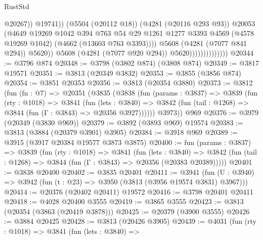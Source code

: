 \begin{lexlean}{RustStd}
\begin{coremodule}
                                              @20267))
                                          @19741))
                                      (@5504 (@20112 @18))
                                      (@4281 (@20116 @293 @93))
                                      @20053
                                      (@4649
                                        @19269
                                        @1042
                                        @394
                                        @763
                                        @54
                                        @29
                                        @1261
                                        @1277
                                        @3393
                                        @4569
                                        (@4578 @19269 @1042)
                                        (@4662 (@13603 @763 @3393))))
                                    @5608
                                    (@4281 (@7077 @841 @294))
                                    @5620))
                                @5608
                                (@4281 (@7077 @920 @294))
                                @5620))))))))))))))
@20344 := @3796 @874
@20348 := @3798 (@3802 @874) (@3808 @874)
@20349 := @3817 @19571
@20351 := @3813 (@20349 @3832)
@20353 := @3855 (@3856 @874)
@20354 := @3851 @20353
@20356 := @3813 (@20354 @3880)
@20373 := @3812
    (fun (fn : @7) =>
    @20351
      (@3835
        (@3838
          (fun (params : @3837) =>
          @3839
            (fun (rty : @1018) =>
            @3841
              (fun (lets : @3840) =>
              @3842 (fun (tail : @1268) => @3844 (fun (Γ : @3843) => @20356 @3927))))))
        @3973))
    @969
@20376 := @3979 (@20349 (@3830 @969))
@20379 := @3892 (@3893 @969) @19574
@20383 := @3813 (@3884 (@20379 @3901) @3905)
@20384 := @3918 @969
@20389 := @3915 (@3917 @20384 @19577 @3873 @3875)
@20400 := fun (params : @3837) =>
  @3839
    (fun (rty : @1018) =>
    @3841
      (fun (lets : @3840) =>
      @3842 (fun (tail : @1268) => @3844 (fun (Γ : @3843) => @20356 (@20383 @20389)))))
@20401 := @3838 @20400
@20402 := @3835 @20401
@20411 := @3941
    (fun (U : @3940) => @3942 (fun (t : @23) => @3950 (@3813 (@3956 @19574 @3831) @3967)))
@20414 := @20376 (@20402 @20411) @19572
@20416 := @3798 @20401 @20411
@20418 := @4028 @20400 @3555
@20419 := @3865 @3555
@20423 := @3813 (@20354 (@3863 (@20419 @3878)))
@20425 := @20379 (@3900 @3555)
@20426 := @3884 @20425
@20428 := @3813 (@20426 @3905)
@20439 := @4031
    (fun (rty : @1018) =>
    @3841
      (fun (lets : @3840) =>

\end{coremodule}
\end{lexlean}
